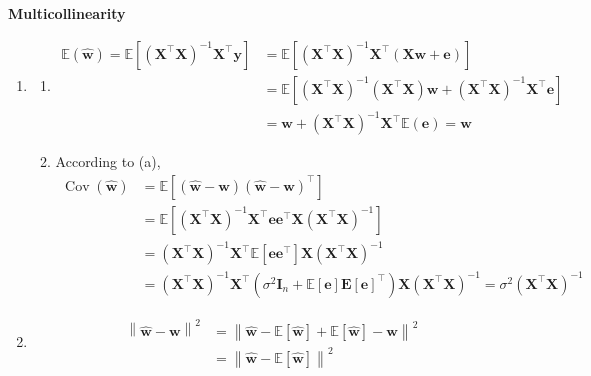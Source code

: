 \documentclass[11pt,letter,notitlepage]{article}
\begin{document}
\newpage

\begin{solution} \textbf{Multicollinearity}
\begin{enumerate}
	\item 
	\begin{enumerate}
		\item 
		\begin{align*}
		\mathbb{E}(\hat{\mathbf{w}})
		=
		\mathbb{E}\left[\left(\mathbf{X}^{\top} \mathbf{X}\right)^{-1} \mathbf{X}^{\top} \mathbf{y}\right]
		&=
		\mathbb{E}\left[\left(\mathbf{X}^{\top} \mathbf{X}\right)^{-1} \mathbf{X}^{\top} (\mathbf{X}\mathbf{w} + \mathbf{e})\right]\\
		&=
		\mathbb{E}\left[\left(\mathbf{X}^{\top} \mathbf{X}\right)^{-1} \left(\mathbf{X}^{\top} \mathbf{X}\right) \mathbf{w} + \left(\mathbf{X}^{\top} \mathbf{X}\right)^{-1} \mathbf{X}^{\top} \mathbf{e}\right]\\
		&=
		\mathbf{w}
		+
		\left(\mathbf{X}^{\top} \mathbf{X}\right)^{-1} \mathbf{X}^{\top} \mathbb{E}(\mathbf{e})
		=
		\mathbf{w}
		\end{align*}
		\item 
		According to (a),
		\begin{align*}
		\operatorname{Cov}(\hat{\mathbf{w}})
		&=
		\mathbb{E}\mathbf{[(\hat{\mathbf{w}}-\mathbf{w})(\hat{\mathbf{w}}-\mathbf{w})^{\top}]}\\
		&=
		\mathbb{E}\left[\left(\mathbf{X}^{\top} \mathbf{X}\right)^{-1} \mathbf{X}^{\top} \mathbf{e}\mathbf{e}^{\top} \mathbf{X}\left(\mathbf{X}^{\top} \mathbf{X}\right)^{-1}\right]\\
		&=
		\left(\mathbf{X}^{\top} \mathbf{X}\right)^{-1} \mathbf{X}^{\top} \mathbb{E}[\mathbf{e}\mathbf{e}^{\top}] \mathbf{X}\left(\mathbf{X}^{\top} \mathbf{X}\right)^{-1}\\
		&=
		\left(\mathbf{X}^{\top} \mathbf{X}\right)^{-1} \mathbf{X}^{\top} \left(\sigma^2 \mathbf{I}_n + \mathbb{E}[\mathbf{e}] \mathbf{E}[\mathbf{e}]^\top\right) \mathbf{X}\left(\mathbf{X}^{\top} \mathbf{X}\right)^{-1}
		=
		\sigma^2 \left(\mathbf{X}^{\top} \mathbf{X}\right)^{-1}
		\end{align*}
	\end{enumerate}
	\item 
	\begin{align*}
	\left\|\hat{\mathbf{w}} - \mathbf{w}\right\|^2
	&=
	\left\| \hat{\mathbf{w}} - \mathbb{E}[\hat{\mathbf{w}}] + \mathbb{E}[\hat{\mathbf{w}}] - \mathbf{w}\right\|^2\\
	&=
	\left\| \hat{\mathbf{w}} - \mathbb{E}[\hat{\mathbf{w}}]\right\|^2

\end{align*}
\end{enumerate}
\end{solution}
\end{document}
